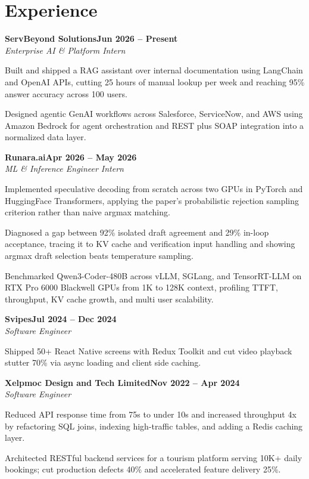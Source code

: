 \documentclass[letterpaper,10pt]{article}
\newlength{\listTopSep}       \setlength{\listTopSep}{1pt}      %
\newlength{\listBottomTrim}   \setlength{\listBottomTrim}{-3pt} %
\newcommand{\heading}[2]{
  \hspace{10pt}#1\hfill#2\\
}
\newcommand{\headingBf}[2]{
  \heading{\textbf{#1}}{\textbf{#2}}
}
\newcommand{\headingIt}[2]{
  \heading{\textit{#1}}{\textit{#2}}
}
\newenvironment{resume_list}{
  \vspace{0pt}
  \begin{itemize}[itemsep=0pt, parsep=0pt, leftmargin=30pt, topsep=\listTopSep]
}{
  \end{itemize}
  \vspace{\listBottomTrim}
}
\begin{document}

  \section{Experience}

  \headingBf{ServBeyond Solutions}{Jun 2026 -- Present}
  \headingIt{Enterprise AI \& Platform Intern}{}
  \begin{resume_list}
    \item Built and shipped a RAG assistant over internal documentation using LangChain and OpenAI APIs, cutting 25 hours of manual lookup per week and reaching 95\% answer accuracy across 100 users.
    \item Designed agentic GenAI workflows across Salesforce, ServiceNow, and AWS using Amazon Bedrock for agent orchestration and REST plus SOAP integration into a normalized data layer.
  \end{resume_list}

  \headingBf{Runara.ai}{Apr 2026 -- May 2026}
  \headingIt{ML \& Inference Engineer Intern}{}
  \begin{resume_list}
    \item Implemented speculative decoding from scratch across two GPUs in PyTorch and HuggingFace Transformers, applying the paper's probabilistic rejection sampling criterion rather than naive argmax matching.
    \item Diagnosed a gap between 92\% isolated draft agreement and 29\% in-loop acceptance, tracing it to KV cache and verification input handling and showing argmax draft selection beats temperature sampling.
    \item Benchmarked Qwen3-Coder-480B across vLLM, SGLang, and TensorRT-LLM on RTX Pro 6000 Blackwell GPUs from 1K to 128K context, profiling TTFT, throughput, KV cache growth, and multi user scalability.
  \end{resume_list}

  \headingBf{Svipes}{Jul 2024 -- Dec 2024}
  \headingIt{Software Engineer}{}
  \begin{resume_list}
    \item Shipped 50+ React Native screens with Redux Toolkit and cut video playback stutter 70\% via async loading and client side caching.
  \end{resume_list}

  \headingBf{Xelpmoc Design and Tech Limited}{Nov 2022 -- Apr 2024}
  \headingIt{Software Engineer}{}
  \begin{resume_list}
    \item Reduced API response time from 75s to under 10s and increased throughput 4x by refactoring SQL joins, indexing high-traffic tables, and adding a Redis caching layer.
    \item Architected RESTful backend services for a tourism platform serving 10K+ daily bookings; cut production defects 40\% and accelerated feature delivery 25\%.
  \end{resume_list}
\end{document}
